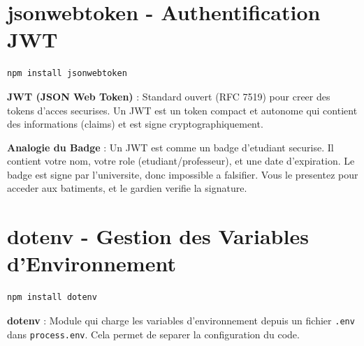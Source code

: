 \documentclass[a4paper,12pt]{book}
\begin{document}
\section{jsonwebtoken - Authentification JWT}

\begin{lstlisting}[style=bash, caption=Installation de jsonwebtoken]
npm install jsonwebtoken
\end{lstlisting}

\begin{definitionbox}
    \textbf{JWT (JSON Web Token)} : Standard ouvert (RFC 7519) pour creer des tokens d'acces securises. Un JWT est un token compact et autonome qui contient des informations (claims) et est signe cryptographiquement.
\end{definitionbox}

\begin{analogybox}
    \textbf{Analogie du Badge} : Un JWT est comme un badge d'etudiant securise. Il contient votre nom, votre role (etudiant/professeur), et une date d'expiration. Le badge est signe par l'universite, donc impossible a falsifier. Vous le presentez pour acceder aux batiments, et le gardien verifie la signature.
\end{analogybox}


\section{dotenv - Gestion des Variables d'Environnement}

\begin{lstlisting}[style=bash, caption=Installation de dotenv]
npm install dotenv
\end{lstlisting}

\begin{definitionbox}
    \textbf{dotenv} : Module qui charge les variables d'environnement depuis un fichier \texttt{.env} dans \texttt{process.env}. Cela permet de separer la configuration du code.
\end{definitionbox}
\end{document}
